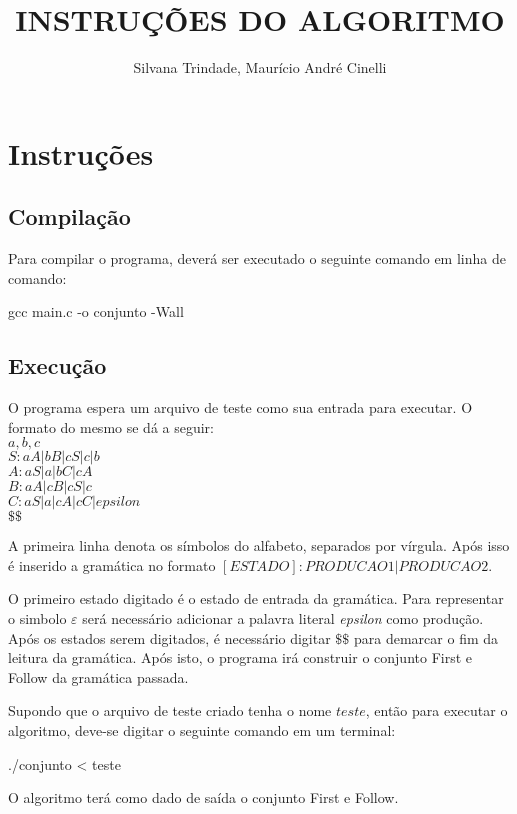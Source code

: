 \documentclass[10pt,a4paper,titlepage]{coursepaper}
\author{Silvana Trindade, Maurício André Cinelli}
\title{INSTRUÇÕES DO ALGORITMO}
\begin{document}
\maketitle

\section *{Instruções}

\subsection *{Compilação}

Para compilar o programa, deverá ser executado o seguinte comando em linha de comando:

\begin{center}
gcc main.c -o conjunto -Wall
\end{center}

\subsection *{Execução}

O programa espera um arquivo de teste como sua entrada para executar.
O formato do mesmo se dá a seguir:\\
$a,b,c$\\
$S:aA|bB|cS|c|b$\\
$A:aS|a|bC|cA$\\
$B:aA|cB|cS|c$\\
$C:aS|a|cA|cC|epsilon$\\
$\$\$$


A primeira linha denota os símbolos do alfabeto, separados por vírgula.
Após isso é inserido a gramática no formato $[ESTADO]:PRODUCAO1|PRODUCAO2$.

O primeiro estado digitado é o estado de entrada da gramática.
Para representar o simbolo $\varepsilon$  será necessário adicionar a palavra literal \textit{epsilon} como produção.
Após os estados serem digitados, é necessário digitar $\$\$$ para demarcar o fim
da leitura da gramática.
Após isto, o programa irá construir o conjunto First e Follow da gramática passada.

Supondo que o arquivo de teste criado tenha o nome $teste$, então para executar o algoritmo, deve-se digitar o seguinte comando em um terminal:

\begin{center}
./conjunto < teste
\end{center}

O algoritmo terá como dado de saída o conjunto First e Follow.
\end{document}
